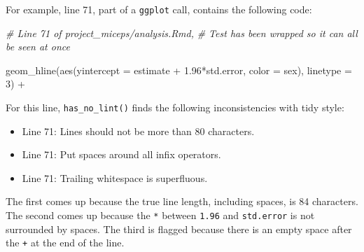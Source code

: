 \documentclass[12pt,twoside]{reedthesis}
\newenvironment{Shaded}{\begin{snugshade}}{\end{snugshade}}
\newcommand{\AttributeTok}[1]{\textcolor[rgb]{0.77,0.63,0.00}{#1}}
\newcommand{\CommentTok}[1]{\textcolor[rgb]{0.56,0.35,0.01}{\textit{#1}}}
\newcommand{\DecValTok}[1]{\textcolor[rgb]{0.00,0.00,0.81}{#1}}
\newcommand{\FloatTok}[1]{\textcolor[rgb]{0.00,0.00,0.81}{#1}}
\newcommand{\FunctionTok}[1]{\textcolor[rgb]{0.00,0.00,0.00}{#1}}
\newcommand{\NormalTok}[1]{#1}
\newcommand{\SpecialCharTok}[1]{\textcolor[rgb]{0.00,0.00,0.00}{#1}}
\begin{document}
For example, line 71, part of a \texttt{ggplot} call, contains the following code:
\begin{Shaded}
\begin{Highlighting}[]
\CommentTok{\# Line 71 of \textasciigrave{}project\_miceps/analysis.Rmd\textquotesingle{}, }
\CommentTok{\# Test has been wrapped so it can all be seen at once}

\FunctionTok{geom\_hline}\NormalTok{(}\FunctionTok{aes}\NormalTok{(}\AttributeTok{yintercept =}\NormalTok{ estimate }\SpecialCharTok{+} \FloatTok{1.96}\SpecialCharTok{*}\NormalTok{std.error, }\AttributeTok{color =}\NormalTok{ sex),}
\AttributeTok{linetype =} \DecValTok{3}\NormalTok{) }\SpecialCharTok{+} 
\end{Highlighting}
\end{Shaded}
For this line, \texttt{has\_no\_lint()} finds the following inconsistencies with tidy style:
\begin{itemize}
\item
  Line 71: Lines should not be more than 80 characters.
\item
  Line 71: Put spaces around all infix operators.
\item
  Line 71: Trailing whitespace is superfluous.
\end{itemize}
The first comes up because the true line length, including spaces, is 84 characters. The second comes up because the \texttt{*} between \texttt{1.96} and \texttt{std.error} is not surrounded by spaces. The third is flagged because there is an empty space after the \texttt{+} at the end of the line.
\end{document}
